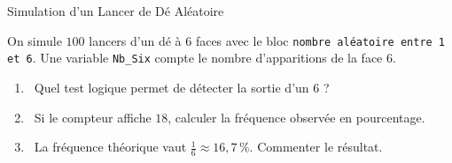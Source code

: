 \newpage

\begin{exercice}[3 pts][\capAnalyser]{Simulation d'un Lancer de Dé Aléatoire}
\noindent
\begin{minipage}[c]{0.58\linewidth}
On simule $100$ lancers d'un dé à 6 faces avec le bloc \texttt{nombre aléatoire entre 1 et 6}.
Une variable \texttt{Nb\_Six} compte le nombre d'apparitions de la face 6.
\begin{enumerate}[leftmargin=1.2em, itemsep=1pt]
    \item \capSApproprier\ Quel test logique permet de détecter la sortie d'un 6 ?
    \item \capRealiser\ Si le compteur affiche $18$, calculer la fréquence observée en pourcentage.
    \item \capValider\ La fréquence théorique vaut $\frac{1}{6} \approx 16{,}7\,\%$. Commenter le résultat.
\end{enumerate}
\end{minipage}\hfill
\begin{minipage}[c]{0.38\linewidth}
\centering
{}
\end{minipage}

\vspace{1mm}
\lignesreponse[2]
\end{exercice}


